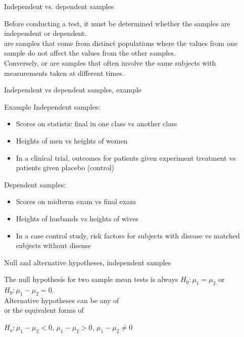 \documentclass[xcolor=table, aspectratio=169, bigger, handout]{beamer}
\begin{document}
\begin{frame}{Independent vs. dependent samples}
\begin{block}{}
Before conducting a test, it must be determined whether the samples are independent or dependent.\\
\pause\medskip
{} are samples that come from distinct populations where the values from one sample do not affect the values from the other samples.\\
\pause\medskip
Conversely,  or  are samples that often involve the same subjects with measurements taken at different times.
\end{block}
\end{frame}

\begin{frame}{Independent vs dependent samples, example}
\begin{exampleblock}{Example}
Independent samples:
\begin{itemize}
\item Scores on statistic final in one class vs another class
\item Heights of men vs heights of women
\item In a clinical trial, outcomes for patients given experiment treatment vs patients given placebo (control)
\end{itemize}
\pause
Dependent samples:
\begin{itemize}
\item Scores on midterm exam vs final exam
\item Heights of husbands vs heights of wives
\item In a case control study, risk factors for subjects with disease vs matched subjects without disease
\end{itemize}
\end{exampleblock}
\end{frame}

\begin{frame}{Null and alternative hypotheses, independent samples}
\begin{block}{}
The null hypothesis for two sample mean tests is always $H_0: \mu_1 = \mu_2$ or $H_0: \mu_1 -\mu_2 = 0$.\\
\medskip
Alternative hypotheses can be any of\\
\medskip
{}
\medskip
 or the equivalent forms of \\
 \medskip
{\centering $H_a: \mu_1 - \mu_2 < 0, \, \mu_1 - \mu_2 > 0, \, \mu_1 - \mu_2 \ne 0$ \par}
\medskip

\end{block}
\end{frame}
\end{document}
